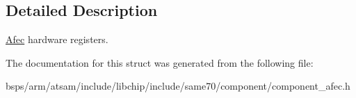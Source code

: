 \subsection{Detailed Description}
\mbox{\hyperlink{structAfec}{Afec}} hardware registers. 

The documentation for this struct was generated from the following file\+:\begin{DoxyCompactItemize}
\item 
bsps/arm/atsam/include/libchip/include/same70/component/component\+\_\+afec.\+h\end{DoxyCompactItemize}

